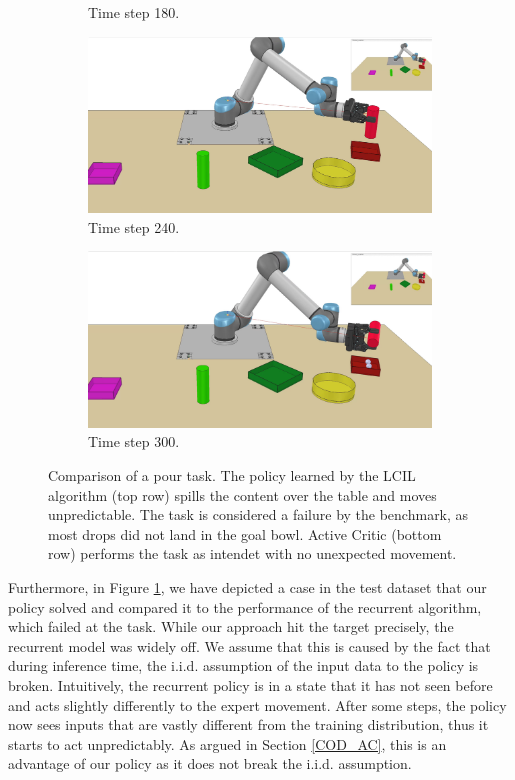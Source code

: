 \begin{figure}
\begin{subfigure}[t]{0.18\textwidth}
        \caption{Time step 180.}
    \end{subfigure}
    \begin{subfigure}[t]{0.18\textwidth}
        \includegraphics[width=\linewidth]{images/Language_Conditioned_Exp/mine_4.png}
        \caption{Time step 240.}
    \end{subfigure}
    \begin{subfigure}[t]{0.18\textwidth}
        \includegraphics[width=\linewidth]{images/Language_Conditioned_Exp/mine_5.png}
        \caption{Time step 300.}
    \end{subfigure}
    \caption{Comparison of a pour task. The policy learned by the LCIL algorithm (top row) spills the content over the table and moves unpredictable. The task is considered a failure 
    by the benchmark, as most drops did not land in the goal bowl. Active Critic (bottom row) performs the task as intendet with no unexpected movement.}
    \label{fig: AC vs. Rec}
\end{figure}
Furthermore, in Figure \ref{fig: AC vs. Rec}, we have depicted a case in the test dataset that our policy solved and compared it to the performance 
of the recurrent algorithm, which failed at the task.
While our approach hit the target precisely, the recurrent model was widely off. We assume that this is caused by the fact that during inference 
time, the
i.i.d. assumption of the input data to the policy is broken. Intuitively, the recurrent policy
is in a state that it has not seen before and acts slightly differently to the expert movement. After some steps, the policy now sees 
inputs that are vastly
different from the training distribution, thus it starts to act unpredictably. As argued in Section \ref{COD_AC}, this is an advantage of our 
policy as it
does not break the i.i.d. assumption.

